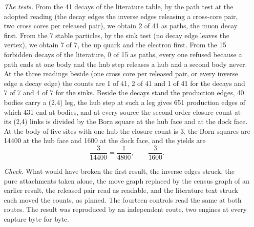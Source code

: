 \begin{chproof}
\emph{The tests.} From the 41 decays of the literature table, by the path test at the adopted reading (the decay edges the inverse edges releasing a cross-core pair, two cross cores per released pair), we obtain 2 of 41 as paths, the muon decay first. From the 7 stable particles, by the sink test (no decay edge leaves the vertex), we obtain 7 of 7, the up quark and the electron first. From the 15 forbidden decays of the literature, 0 of 15 as paths, every one refused because a path ends at one body and the hub step releases a hub and a second body never. At the three readings beside (one cross core per released pair, or every inverse edge a decay edge) the counts are 1 of 41, 2 of 41 and 1 of 41 for the decays and 7 of 7 and 4 of 7 for the sinks. Beside the decays stand the production edges, 40 bodies carry a (2,4) leg, the hub step at such a leg gives 651 production edges of which 431 end at bodies, and at every source the second-order closure count at its (2,4) links is divided by the Born square at the hub face and at the dock face. At the body of five sites with one hub the closure count is 3, the Born squares are 14400 at the hub face and 1600 at the dock face, and the yields are
\begin{equation}
\frac{3}{14400} = \frac{1}{4800}, \qquad \frac{3}{1600} .
\end{equation}

\emph{Check.} What would have broken the first result, the inverse edges struck, the pure attachments taken alone, the move graph replaced by the census graph of an earlier result, the released pair read as readable, and the literature text struck each moved the counts, as pinned. The fourteen controls read the same at both routes. The result was reproduced by an independent route, two engines at every capture byte for byte.
\end{chproof}
